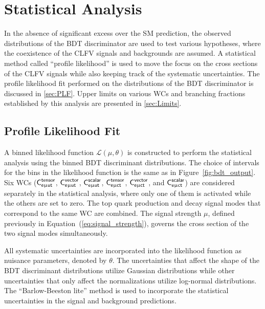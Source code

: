 \chapter{Statistical Analysis}
\label{chap:Results}

In the absence of significant excess over the \ac{SM} prediction, the observed distributions of the \ac{BDT} discriminator are used to test various hypotheses, where the coexistence of the \ac{CLFV} signals and backgrounds are assumed. A statistical method called ``profile likelihood'' is used to move the focus on the cross sections of the \ac{CLFV} signals while also keeping track of the systematic uncertainties. The profile likelihood fit performed on the distributions of the \ac{BDT} discriminator is discussed in \autoref{sec:PLF}. Upper limits on various \acp{WC} and branching fractions established by this analysis are presented in \autoref{sec:Limits}. 

\section{Profile Likelihood Fit}
\label{sec:PLF}

A binned likelihood function $\mathcal{L}(\mu, \theta)$ is constructed to perform the statistical analysis using the binned \ac{BDT} discriminant distributions. The choice of intervals for the bins in the likelihood function is the same as in Figure~\ref{fig:bdt_output}. Six \acp{WC} ($\textsf{C}^{\textsf{tensor}}_{\textsf{e}\upmu\textsf{{u}t}}$, $\textsf{C}^{\textsf{vector}}_{\textsf{e}\upmu\textsf{{u}t}}$, $\textsf{C}^{\textsf{scalar}}_{\textsf{e}\upmu\textsf{{u}t}}$, $\textsf{C}^{\textsf{tensor}}_{\textsf{e}\upmu\textsf{{c}t}}$, $\textsf{C}^{\textsf{vector}}_{\textsf{e}\upmu\textsf{{c}t}}$, and $\textsf{C}^{\textsf{scalar}}_{\textsf{e}\upmu\textsf{{c}t}}$) are considered separately in the statistical analysis, where only one of them is activated while the others are set to zero. The top quark production and decay signal modes that correspond to the same \ac{WC} are combined. The signal strength $\mu$, defined previously in Equation~(\ref{eq:signal_strength}), governs the cross section of the two signal modes simultaneously. 

All systematic uncertainties are incorporated into the likelihood function as nuisance parameters, denoted by $\theta$. The uncertainties that affect the shape of the \ac{BDT} discriminant distributions utilize Gaussian distributions while other uncertainties that only affect the normalizations utilize log-normal distributions. The ``Barlow-Beeston lite'' method \cite{Barlow:1993dm} is used to incorporate the statistical uncertainties in the signal and background predictions. 

